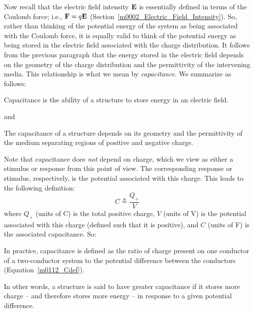 Now recall that the electric field intensity ${\bf E}$ 
is essentially defined in terms of the Coulomb force; 
i.e., ${\bf F}=q{\bf E}$ (Section~\ref{m0002_Electric_Field_Intensity}).
So, rather than thinking of the potential energy of the system as being associated with the Coulomb force, it is equally valid to think of the potential energy as being stored in the electric field associated with the charge distribution.
It follows from the previous paragraph that the energy stored in the electric field depends on the geometry of the charge distribution and the permittivity of the intervening media.  
This relationship is what we mean by \emph{capacitance}.
We summarize as follows:
%
\begin{mdframed}[backgroundcolor=yellow!20,nobreak=true] 
Capacitance 
is the ability of a structure to store energy in an electric field.
\end{mdframed}
%
and
%
\begin{mdframed}[backgroundcolor=yellow!20,nobreak=true] 
The capacitance of a structure depends on its geometry and the permittivity of the medium separating regions of positive and negative charge.
\end{mdframed}

Note that capacitance does \emph{not} depend on charge, which we view as either a stimulus or response from this point of view.
The corresponding response or stimulus, respectively, is the potential associated with this charge.
This leads to the following definition:
%
\begin{equation}
\boxed{
C \triangleq \frac{Q_+}{V}
}
\label{m0112_Cdef}
\end{equation} 
%
where $Q_+$ (units of C) is the total positive charge, $V$ (units of V) is the potential associated with this charge (defined such that it is positive),  and $C$ (units of F) is the associated capacitance. So:
%
\begin{mdframed}[backgroundcolor=yellow!20,nobreak=true] 
In practice, capacitance is defined as the ratio of charge present on one conductor of a two-conductor system to the potential difference between the conductors (Equation~\ref{m0112_Cdef}). 
\end{mdframed}
%
In other words, a structure is said to have greater capacitance if it stores more charge -- and therefore stores more energy -- in response to a given potential difference.

